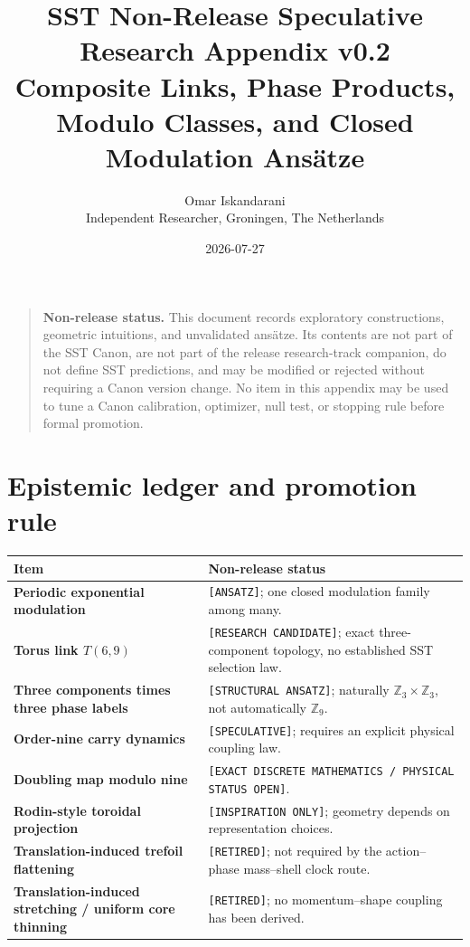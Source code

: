 \documentclass[11pt]{article}
\title{SST Non-Release Speculative Research Appendix v0.2\\
\large Composite Links, Phase Products, Modulo Classes, and Closed Modulation Ans\"atze}
\author{Omar Iskandarani\\Independent Researcher, Groningen, The Netherlands}
\date{2026-07-27}
\newcommand{\Z}{\mathbb Z}
\begin{document}
\maketitle

\begin{quote}
\textbf{Non-release status.}
This document records exploratory constructions, geometric intuitions, and
unvalidated ans\"atze.  Its contents are not part of the SST Canon, are not part
of the release research-track companion, do not define SST predictions, and
may be modified or rejected without requiring a Canon version change.  No item
in this appendix may be used to tune a Canon calibration, optimizer, null test,
or stopping rule before formal promotion.
\end{quote}

\section{Epistemic ledger and promotion rule}

\begin{center}
\begin{tabularx}{0.96\textwidth}{@{}>{\bfseries}p{}X@{}}
\toprule
Item & Non-release status \\
\midrule
Periodic exponential modulation & \texttt{[ANSATZ]}; one closed modulation family among many. \\
Torus link $T(6,9)$ & \texttt{[RESEARCH CANDIDATE]}; exact three-component topology, no established SST selection law. \\
Three components times three phase labels & \texttt{[STRUCTURAL ANSATZ]}; naturally $\Z_3\times\Z_3$, not automatically $\Z_9$. \\
Order-nine carry dynamics & \texttt{[SPECULATIVE]}; requires an explicit physical coupling law. \\
Doubling map modulo nine & \texttt{[EXACT DISCRETE MATHEMATICS / PHYSICAL STATUS OPEN]}. \\
Rodin-style toroidal projection & \texttt{[INSPIRATION ONLY]}; geometry depends on representation choices. \\
Translation-induced trefoil flattening & \texttt{[RETIRED]}; not required by the action--phase mass--shell clock route. \\
Translation-induced stretching / uniform core thinning & \texttt{[RETIRED]}; no momentum--shape coupling has been derived. \\
\bottomrule
\end{tabularx}
\end{center}
\end{document}
